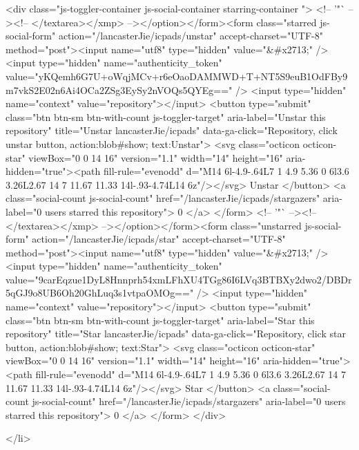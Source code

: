   <div class="js-toggler-container js-social-container starring-container ">
    <!-- '"` --><!-- </textarea></xmp> --></option></form><form class="starred js-social-form" action="/lancasterJie/icpads/unstar" accept-charset="UTF-8" method="post"><input name="utf8" type="hidden" value="&#x2713;" /><input type="hidden" name="authenticity_token" value="yKQemh6G7U+oWqjMCv+r6eOaoDAMMWD+T+NT5S9euB1OdFBy9m7vkS2E02n6Ai4OCa2ZSg3EySy2nVOQs5QYEg==" />
      <input type="hidden" name="context" value="repository"></input>
      <button
        type="submit"
        class="btn btn-sm btn-with-count js-toggler-target"
        aria-label="Unstar this repository" title="Unstar lancasterJie/icpads"
        data-ga-click="Repository, click unstar button, action:blob#show; text:Unstar">
        <svg class="octicon octicon-star" viewBox="0 0 14 16" version="1.1" width="14" height="16" aria-hidden="true"><path fill-rule="evenodd" d="M14 6l-4.9-.64L7 1 4.9 5.36 0 6l3.6 3.26L2.67 14 7 11.67 11.33 14l-.93-4.74L14 6z"/></svg>
        Unstar
      </button>
        <a class="social-count js-social-count" href="/lancasterJie/icpads/stargazers"
           aria-label="0 users starred this repository">
          0
        </a>
</form>
    <!-- '"` --><!-- </textarea></xmp> --></option></form><form class="unstarred js-social-form" action="/lancasterJie/icpads/star" accept-charset="UTF-8" method="post"><input name="utf8" type="hidden" value="&#x2713;" /><input type="hidden" name="authenticity_token" value="9carEqzue1DyL8Hnnprh54xmLFhXU4TGg86I6LVq3BTBXy2dwo2/DBDr5qGJ9o8UB6Oh20GhLuq3s1vtpaOMOg==" />
      <input type="hidden" name="context" value="repository"></input>
      <button
        type="submit"
        class="btn btn-sm btn-with-count js-toggler-target"
        aria-label="Star this repository" title="Star lancasterJie/icpads"
        data-ga-click="Repository, click star button, action:blob#show; text:Star">
        <svg class="octicon octicon-star" viewBox="0 0 14 16" version="1.1" width="14" height="16" aria-hidden="true"><path fill-rule="evenodd" d="M14 6l-4.9-.64L7 1 4.9 5.36 0 6l3.6 3.26L2.67 14 7 11.67 11.33 14l-.93-4.74L14 6z"/></svg>
        Star
      </button>
        <a class="social-count js-social-count" href="/lancasterJie/icpads/stargazers"
           aria-label="0 users starred this repository">
          0
        </a>
</form>  </div>

  </li>


